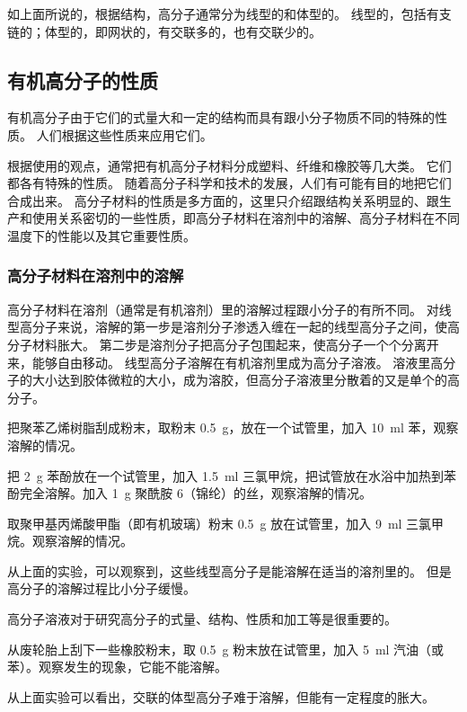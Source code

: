 如上面所说的，根据结构，高分子通常分为线型的和体型的。
线型的，包括有支链的；体型的，即网状的，有交联多的，也有交联少的。

\subsection{有机高分子的性质}
有机高分子由于它们的式量大和一定的结构而具有跟小分子物质不同的特殊的性质。
人们根据这些性质来应用它们。

根据使用的观点，通常把有机高分子材料分成塑料、纤维和橡胶等几大类。
它们都各有特殊的性质。
随着高分子科学和技术的发展，人们有可能有目的地把它们合成出来。
高分子材料的性质是多方面的，这里只介绍跟结构关系明显的、跟生产和使用关系密切的一些性质，即高分子材料在溶剂中的溶解、高分子材料在不同温度下的性能以及其它重要性质。

\subsubsection{高分子材料在溶剂中的溶解}
高分子材料在溶剂（通常是有机溶剂）里的溶解过程跟小分子的有所不同。
对线型高分子来说，溶解的第一步是溶剂分子渗透入缠在一起的线型高分子之间，使高分子材料胀大。
第二步是溶剂分子把高分子包围起来，使高分子一个个分离开来，能够自由移动。
线型高分子溶解在有机溶剂里成为高分子溶液。
溶液里高分子的大小达到胶体微粒的大小，成为溶胶，但高分子溶液里分散着的又是单个的高分子。

\begin{Experiment}
把聚苯乙烯树脂刮成粉末，取粉末 \qty{0.5}{g}，放在一个试管里，加入 \qty{10}{ml} 苯，观察溶解的情况。
\end{Experiment}

\begin{Experiment}\label{expr:5-2}
  把 \qty{2}{g} 苯酚放在一个试管里，加入 \qty{1.5}{ml} 三氯甲烷，把试管放在水浴中加热到苯酚完全溶解。加入 \qty{1}{g} 聚酰胺 6（锦纶）的丝，观察溶解的情况。
\end{Experiment}

\begin{Experiment}\label{expr:5-3}
取聚甲基丙烯酸甲酯（即有机玻璃）粉末 \qty{0.5}{g} 放在试管里，加入 \qty{9}{ml} 三氯甲烷。观察溶解的情况。
\end{Experiment}

从上面的实验，可以观察到，这些线型高分子是能溶解在适当的溶剂里的。
但是高分子的溶解过程比小分子缓慢。

高分子溶液对于研究高分子的式量、结构、性质和加工等是很重要的。

\begin{Experiment}
从废轮胎上刮下一些橡胶粉末，取 \qty{0.5}{g} 粉末放在试管里，加入 \qty{5}{ml} 汽油（或苯）。观察发生的现象，它能不能溶解。
\end{Experiment}
从上面实验可以看出，交联的体型高分子难于溶解，但能有一定程度的胀大。


